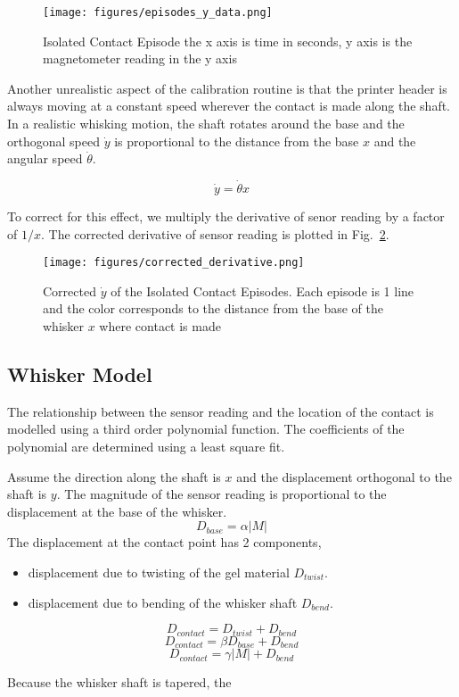 \documentclass{article}
\begin{document}
\begin{figure}[h]
    \centering
    \texttt{[image: figures/episodes\_y\_data.png]}
    \caption{Isolated Contact Episode the x axis is time in seconds, y axis is the magnetometer reading in the y axis}
    \label{fig:episodes_y_data.png}
\end{figure}

Another unrealistic aspect of the calibration routine is that the printer header is always moving at a constant speed wherever the contact is made along the shaft. In a realistic whisking motion, the shaft rotates around the base and the orthogonal speed \(\dot{y}\) is proportional to the distance from the base \(x\) and the angular speed \(\dot{\theta}\).

\[\dot{y} = \dot{\theta}x\]

To correct for this effect, we multiply the derivative of senor reading by a factor of \(1/x\). The corrected derivative of sensor reading is plotted in Fig.~\ref{fig:corrected_derivative.png}.

\begin{figure}
    \centering
    \texttt{[image: figures/corrected\_derivative.png]}
    \caption{Corrected \(\dot{y}\) of the Isolated Contact Episodes. Each episode is 1 line and the color corresponds to the distance from the base of the whisker \(x\) where contact is made}
    \label{fig:corrected_derivative.png}
\end{figure}

\subsection{Whisker Model}

The relationship between the sensor reading and the location of the contact is modelled using a third order polynomial function. The coefficients of the polynomial are determined using a least square fit.

Assume the direction along the shaft is \(x\) and the displacement orthogonal to the shaft is \(y\).
The magnitude of the sensor reading is proportional to the displacement at the base of the whisker.
\[D_{base} = \alpha |M| \]
The displacement at the contact point has 2 components,
\begin{itemize}
    \item displacement due to twisting of the gel material \(D_{twist}\).
    \item displacement due to bending of the whisker shaft \(D_{bend}\).
\end{itemize}
\[D_{contact} = D_{twist} + D_{bend}\]
\[D_{contact} = \beta D_{base} + D_{bend}\]
\[D_{contact} = \gamma |M| + D_{bend}\]

Because the whisker shaft is tapered, the
\end{document}
